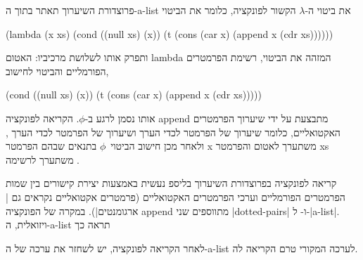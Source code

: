 פרוצדורת השיערוך תאתר בתוך ה-a-list את ביטוי ה-$λ$ הקשור לפונקציה, כלומר
את הביטוי
\begin{LISP}
(lambda
  (x xs)
  (cond ((null xs) (x))
        (t (cons
              (car x)
              (append x (cdr xs))))))
\end{LISP}
ותפרק אותו לשלושת
מרכיביו: האטום lambda המזהה את הביטוי, רשימת הפרמטרים הפורמליים 
והביטוי לחישוב,
\begin{LISP}
(cond ((null xs) (x))
      (t (cons
            (car x)
            (append x (cdr xs)))))
\end{LISP}
אותו נסמן לרגע ב-$ϕ$. הקריאה לפונקציה append מתבצעת על ידי שיערוך הפרמטרים
האקטואליים, כלומר שיערוך של הפרמטר  לכדי הערך  ושיערוך של
הפרמטר  לכדי הערך , ולאחר מכן חישוב הביטוי~$ϕ$ בתנאים
שבהם הפרמטר x משתערך לאטום  והפרמטר xs משתערך לרשימה .

קריאה לפונקציה בפרוצדורת השיערוך בליספ נעשית באמצעות יצירת קישורים בין שמות
הפרמטרים הפורמליים וערכי הפרמטרים האקטואליים (פרמטרים אקטואליים נקראים גם
\ע|ארגומנטים|). במקרה של הפונקציה append מתווספים שני \E|dotted-pairs|
 ו- ל-\E|a-list|.
ויזואלית, ה-a-list תראה כך
\begin{LTR}
\end{LTR}
לאחר הקריאה לפונקציה, יש לשחזר את ערכה של ה-a-list לערכה המקורי טרם הקריאה לה.

